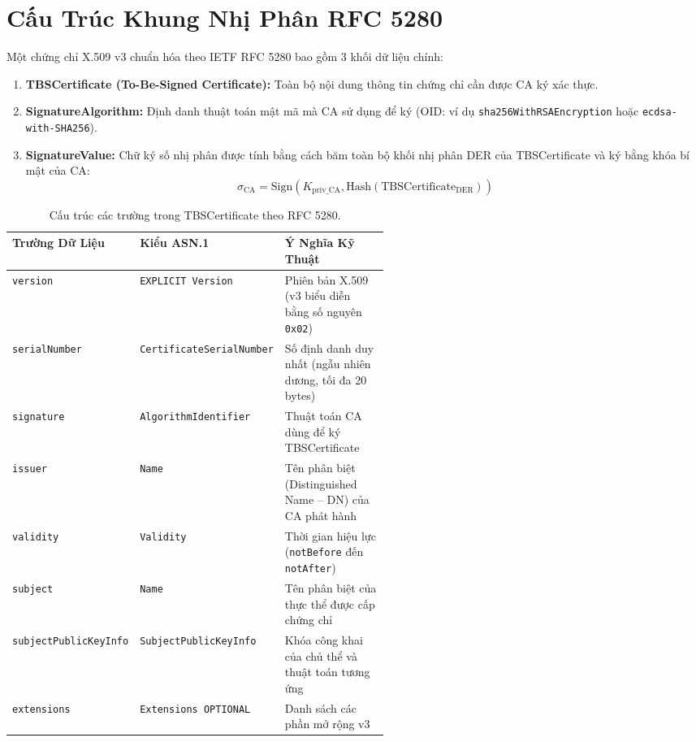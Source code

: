 \section{Cấu Trúc Khung Nhị Phân RFC 5280}

Một chứng chỉ X.509 v3 chuẩn hóa theo IETF RFC 5280 bao gồm 3 khối dữ liệu chính:
\begin{enumerate}
  \item \textbf{TBSCertificate (To-Be-Signed Certificate):} Toàn bộ nội dung thông tin chứng chỉ cần được CA ký xác thực.
  \item \textbf{SignatureAlgorithm:} Định danh thuật toán mật mã mà CA sử dụng để ký (OID: ví dụ \texttt{sha256WithRSAEncryption} hoặc \texttt{ecdsa-with-SHA256}).
  \item \textbf{SignatureValue:} Chữ ký số nhị phân được tính bằng cách băm toàn bộ khối nhị phân DER của TBSCertificate và ký bằng khóa bí mật của CA:
  \begin{equation}
  \sigma_{\text{CA}} = \text{Sign}(K_{\text{priv\_CA}}, \text{Hash}(\text{TBSCertificate}_{\text{DER}}))
  \end{equation}
\end{enumerate}

\begin{table}[h]
\centering\small
\begin{tabularx}{\linewidth}{@{}p{0.26\linewidth} p{0.28\linewidth} X@{}}
\toprule
\textbf{Trường Dữ Liệu} & \textbf{Kiểu ASN.1} & \textbf{Ý Nghĩa Kỹ Thuật} \\
\midrule
\texttt{version} & \texttt{EXPLICIT Version} & Phiên bản X.509 (v3 biểu diễn bằng số nguyên \texttt{0x02}) \\
\texttt{serialNumber} & \texttt{CertificateSerialNumber} & Số định danh duy nhất (ngẫu nhiên dương, tối đa 20 bytes) \\
\texttt{signature} & \texttt{AlgorithmIdentifier} & Thuật toán CA dùng để ký TBSCertificate \\
\texttt{issuer} & \texttt{Name} & Tên phân biệt (Distinguished Name -- DN) của CA phát hành \\
\texttt{validity} & \texttt{Validity} & Thời gian hiệu lực (\texttt{notBefore} đến \texttt{notAfter}) \\
\texttt{subject} & \texttt{Name} & Tên phân biệt của thực thể được cấp chứng chỉ \\
\texttt{subjectPublicKeyInfo} & \texttt{SubjectPublicKeyInfo} & Khóa công khai của chủ thể và thuật toán tương ứng \\
\texttt{extensions} & \texttt{Extensions OPTIONAL} & Danh sách các phần mở rộng v3 \\
\bottomrule
\end{tabularx}
\caption{Cấu trúc các trường trong TBSCertificate theo RFC 5280.}
\end{table}

